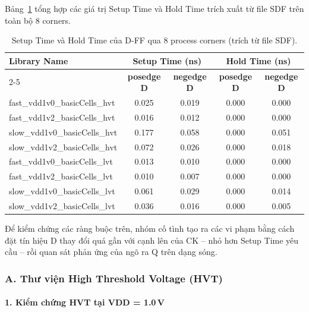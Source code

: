 \documentclass[12pt, a4paper, oneside]{article}
\begin{document}
Bảng~\ref{tab:exp2_setup_hold} tổng hợp các giá trị Setup Time và Hold Time trích xuất
từ file SDF trên toàn bộ 8 corners.

\begin{table}[H]
    \centering
    \begin{tabular}{|l|c|c|c|c|}
        \hline
        \multirow{2}{*}{\textbf{Library Name}}
            & \multicolumn{2}{c|}{\textbf{Setup Time (ns)}}
            & \multicolumn{2}{c|}{\textbf{Hold Time (ns)}} \\
        \cline{2-5}
            & \textbf{posedge D} & \textbf{negedge D}
            & \textbf{posedge D} & \textbf{negedge D} \\
        \hline
        fast\_vdd1v0\_basicCells\_hvt & 0.025 & 0.019 & 0.000 & 0.000 \\ \hline
        fast\_vdd1v2\_basicCells\_hvt & 0.016 & 0.012 & 0.000 & 0.000 \\ \hline
        slow\_vdd1v0\_basicCells\_hvt & 0.177 & 0.058 & 0.000 & 0.051 \\ \hline
        slow\_vdd1v2\_basicCells\_hvt & 0.072 & 0.026 & 0.000 & 0.018 \\ \hline
        fast\_vdd1v0\_basicCells\_lvt & 0.013 & 0.010 & 0.000 & 0.000 \\ \hline
        fast\_vdd1v2\_basicCells\_lvt & 0.010 & 0.007 & 0.000 & 0.000 \\ \hline
        slow\_vdd1v0\_basicCells\_lvt & 0.061 & 0.029 & 0.000 & 0.014 \\ \hline
        slow\_vdd1v2\_basicCells\_lvt & 0.036 & 0.016 & 0.000 & 0.005 \\ \hline
    \end{tabular}
    \caption{Setup Time và Hold Time của D-FF qua 8 process corners (trích từ file SDF).}
    \label{tab:exp2_setup_hold}
\end{table}

Để kiểm chứng các ràng buộc trên, nhóm cố tình tạo ra các vi phạm bằng cách đặt tín
hiệu D thay đổi quá gần với cạnh lên của CK -- nhỏ hơn Setup Time yêu cầu -- rồi quan
sát phản ứng của ngõ ra Q trên dạng sóng.

\subsubsection*{A. Thư viện High Threshold Voltage (HVT)}

\paragraph{1. Kiểm chứng HVT tại VDD = 1.0\,V}
\end{document}
